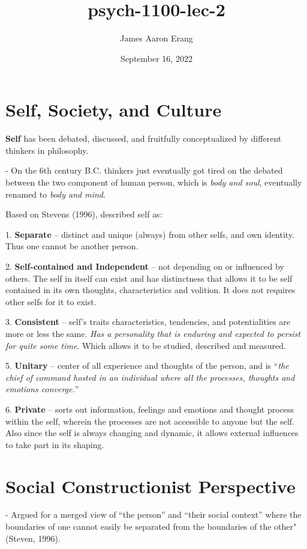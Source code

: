 \documentclass[12pt, UTF8]{article}
\title{psych-1100-lec-2}
\author{James Aaron Erang}
\date{September 16, 2022}
\begin{document}
	\maketitle
	
	\section*{Self, Society, and Culture}
	
	\textbf{Self} has been debated, discussed, and fruitfully conceptualized by different thinkers in philosophy.
	
	- On the 6th century B.C. thinkers just eventually got tired on the debated between the two component of human person, which is \textit{body and soul}, eventually renamed to \textit{body and mind}.
	
	Based on Stevens (1996), described self as:
	
	1. \textbf{Separate} -- distinct and unique (always) from other selfs, and own identity. Thus one cannot be another person.
	
	2. \textbf{Self-contained and Independent} -- not depending on or influenced by others. The self in itself can exist and has distinctness that allows it to be self contained in its own thoughts, characteristics and volition. It does not requires other selfs for it to exist.
	
	3. \textbf{Consistent} -- self's traits characteristics, tendencies, and potentialities are more or less the same. \textit{Has a personality that is enduring and expected to persist for quite some time}. Which allows it to be studied, described and measured.
	
	5. \textbf{Unitary} -- center of all experience and thoughts of the person, and is ``\textit{the chief of command hosted in an individual where all the processes, thoughts and emotions converge.}''
	
	6. \textbf{Private} -- sorts out information, feelings and emotions and thought process within the self, wherein the processes are not accessible to anyone but the self. Also since the self is always changing and dynamic, it allows external influences to take part in its shaping.
	
	\section{Social Constructionist Perspective}
	
	- Argued for a merged view of ``the person'' and ``their social context'' where the boundaries of one cannot easily be separated from the boundaries of the other" (Steven, 1996).
	
\end{document}
